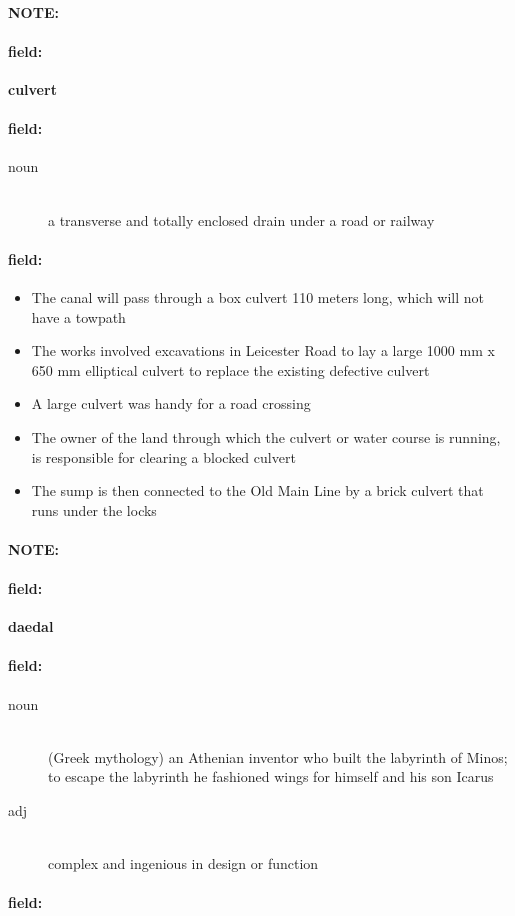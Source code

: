 \documentclass[12pt]{article}
\newenvironment{note}{\paragraph{NOTE:}}{}
\newenvironment{field}{\paragraph{field:}}{}
\begin{document}
\begin{note}
\begin{field}
\textbf{\large culvert}
\end{field}


\begin{field}
\begin{description}
\item[noun] \hfill \\ 
a transverse and totally enclosed drain under a road or railway

\end{description}
\end{field}

\begin{field}
\begin{itemize}
\item The canal will pass through a box culvert 110 meters long, which will not have a towpath
\item The works involved excavations in Leicester Road to lay a large 1000 mm x 650 mm elliptical culvert to replace the existing defective culvert
\item A large culvert was handy for a road crossing
\item The owner of the land through which the culvert or water course is running, is responsible for clearing a blocked culvert
\item The sump is then connected to the Old Main Line by a brick culvert that runs under the locks
\end{itemize}
\end{field}
\end{note}
\begin{note}
\begin{field}
\textbf{\large daedal}
\end{field}


\begin{field}
\begin{description}
\item[noun] \hfill \\ 
(Greek mythology) an Athenian inventor who built the labyrinth of Minos; to escape the labyrinth he fashioned wings for himself and his son Icarus

\item[adj] \hfill \\ 
complex and ingenious in design or function

\end{description}
\end{field}

\begin{field}
\end{field}
\end{note}
\end{document}
